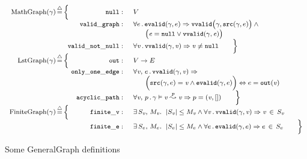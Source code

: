 \begin{figure}
\begin{equation*}
{\footnotesize
\begin{array}{r@{}c@{}c@{\!}rl}
        \mathrm{MathGraph}(\gamma)\,&\defeq&\,\Big\{&\mathtt{null}:&\; V\\
          &&&\mathtt{valid\_graph}:&\; \forall e\,.\,\mathtt{evalid}(\gamma, e) \Rightarrow
          \mathtt{vvalid}\big(\gamma, \mathtt{src}(\gamma, e)\big)\wedge \null \\
          &&&&\qquad \big(\m{e} = \mathtt{null} \vee \mathtt{vvalid}(\gamma, \m{e})\big)\\
          &&&\mathtt{valid\_not\_null}:&\; \forall \m{v}\,.\,\mathtt{vvalid}(\gamma, \m{v})
          \Rightarrow \m{v} \neq \mathtt{null} \qquad \Big\} \\
        \mathrm{LstGraph}(\gamma)\,&\defeq&\, \Big\{&\mathtt{out}:&\; V \rightarrow E\\
          &&&\mathtt{only\_one\_edge}:&\; \forall \m{v},\,e\,.\,
          \mathtt{vvalid}(\gamma, \m{v}) \Rightarrow \\
          &&&&\qquad \Big(\mathtt{src}(\gamma, e) =\m{v} \wedge
                \mathtt{evalid}(\gamma, e)\Big) \Leftrightarrow e = \mathtt{out}(\m{v})\\
          &&&\mathtt{acyclic\_path}:&\; \forall \m{v},\,p\,.\,
          \gamma \vDash \m{v} \overset{p}{\leadsto} \m{v} \Rightarrow p = (\m{v},[]) \qquad \Big\} \\
       	\mathrm{FiniteGraph}(\gamma)\,&\defeq&\, \Big\{&\mathtt{finite\_v}:&\;\exists\, S_\m{v},\, M_\m{v}.~\;\lvert S_\m{v}\rvert
          \leq M_\m{v} \wedge
          \forall \m{v}\,.\, \mathtt{vvalid}(\gamma,\m{v})\Rightarrow \m{v}\,\in\,S_\m{v}\\
          &&&\mathtt{finite\_e}:&\;\exists\, S_e,\, M_e.~\;\lvert S_e\rvert
          \leq M_e \wedge
          \forall e\,.\, \mathtt{evalid}(\gamma,e)\Rightarrow e\,\in\,S_e \qquad \Big\}
\end{array}}
\end{equation*}
\vspace{-1em}
\caption{Some GeneralGraph definitions}
\label{fig:gengraphdefs}
\vspace{-1.5em}

\end{figure} 